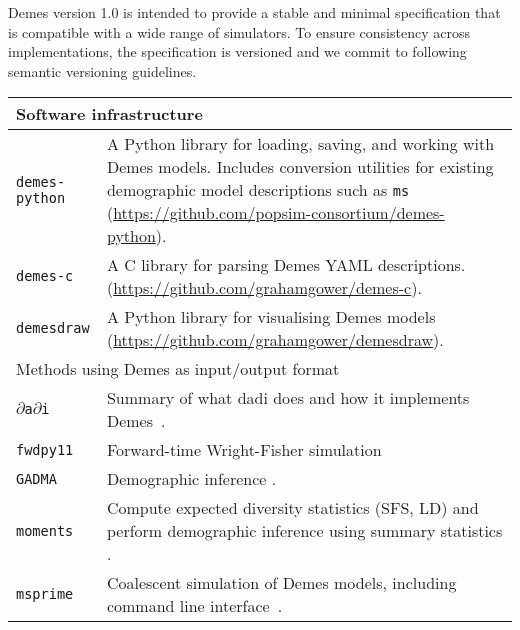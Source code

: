 \documentclass[11pt]{article}
\newcommand{\msprime}[0]{\texttt{msprime}}
\newcommand{\moments}[0]{\texttt{moments}}
\newcommand{\dadi}[0]{\texttt{$\partial$a$\partial$i}}
\newcommand{\fwdpy}[0]{\texttt{fwdpy11}}
\newcommand{\gadma}[0]{\texttt{GADMA}}
\begin{document}
Demes version 1.0 is intended to provide a stable and minimal specification
that is compatible with a wide range of simulators. To ensure consistency
across implementations, the specification is versioned and we commit to
following semantic versioning guidelines.

\renewcommand{\arraystretch}{1.5}
\begin{table}
\begin{center}
\begin{tabular}{lp{12cm}}
\toprule
\multicolumn{2}{l}{Software infrastructure}\\
\midrule
\texttt{demes-python} &
    A Python library for loading, saving, and working with
    Demes models. Includes conversion utilities for existing
    demographic model descriptions such as
    \texttt{ms}~\citep{hudson2002generating}
    (\url{https://github.com/popsim-consortium/demes-python}).\\

\texttt{demes-c} &
    A C library for parsing Demes YAML descriptions.
    (\url{https://github.com/grahamgower/demes-c}). \\

\texttt{demesdraw} &
    A Python library for visualising Demes models
    (\url{https://github.com/grahamgower/demesdraw}). \\

\midrule
\multicolumn{2}{l}{Methods using Demes as input/output format}\\
\midrule


\dadi &
    Summary of what dadi does and how it implements Demes~\citep{gutenkunst2009inferring}.
    \\

\fwdpy &
    Forward-time Wright-Fisher simulation \citep{thornton2014cpp,thornton2019-nu}\\

\gadma &
    Demographic inference \citep{noskova2020gadma}.\\

\moments &
    Compute expected diversity statistics (SFS, LD) and perform
    demographic inference using summary statistics
    \citep{jouganous2017inferring,ragsdale2019models}.\\

\msprime &
    Coalescent simulation of Demes models, including command line
    interface~\citep{kelleher2016efficient,kelleher2020coalescent,baumdicker2021-iu}.\\


\end{tabular}
\end{center}
\end{table}
\end{document}
